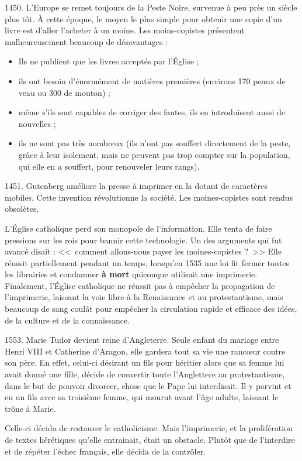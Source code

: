 1450.
L'Europe se remet toujours de la Peste Noire, survenue à peu près un siècle plus tôt.
À cette époque, le moyen le plus simple pour obtenir une copie d'un livre est d'aller l'acheter à un moine.
Les moins-copistes présentent malheureusement beaucoup de désavantages :

\begin{itemize}
\item Ils ne publient que les livres acceptés par l'Église ;
\item ils ont besoin d'énormément de matières premières (environs 170 peaux de veau ou 300 de mouton) ;
\item même s'ils sont capables de corriger des fautes, ils en introduisent aussi de nouvelles ;
\item ils ne sont pas très nombreux (ils n'ont pas souffert directement de la peste, grâce à leur isolement, mais ne peuvent pas trop compter sur la population, qui elle en a souffert, pour renouveler leurs rangs).
\end{itemize}

1451.
Gutenberg améliore la presse à imprimer en la dotant de caractères mobiles.
Cette invention révolutionne la société.
Les moines-copistes sont rendus obsolètes.

L'Église catholique perd son monopole de l'information.
Elle tenta de faire pressions sur les rois pour bannir cette technologie.
Un des arguments qui fut avancé disait : <<~comment allons-nous payer les moines-copistes ?~>>
Elle réussit partiellement pendant un temps, lorsqu'en 1535 une loi fit fermer toutes les librairies et condamner \textbf{à mort} quiconque utilisait une imprimerie.
Finalement, l'Église catholique ne réussit pas à empêcher la propagation de l'imprimerie, laissant la voie libre à la Renaissance et au protestantisme, mais beaucoup de sang coulât pour empêcher la circulation rapide et efficace des idées, de la culture et de la connaissance.

1553.
Marie Tudor devient reine d'Angleterre.
Seule enfant du mariage entre Henri VIII et Catherine d'Aragon, elle gardera tout sa vie une rancœur contre son père.
En effet, celui-ci désirant un fils pour héritier alors que sa femme lui avait donné une fille, décide de convertir toute l'Anglettere au protestantisme, dans le but de pouvoir divorcer, chose que le Pape lui interdisait.
Il y parvint et eu un fils avec sa troisième femme, qui mourut avant l'âge adulte, laissant le trône à Marie.

Celle-ci décida de restaurer le catholicisme.
Mais l'imprimerie, et la prolifération de textes hérétiques qu'elle entrainait, était un obstacle.
Plutôt que de l'interdire et de répéter l'échec français, elle décida de la contrôler.

